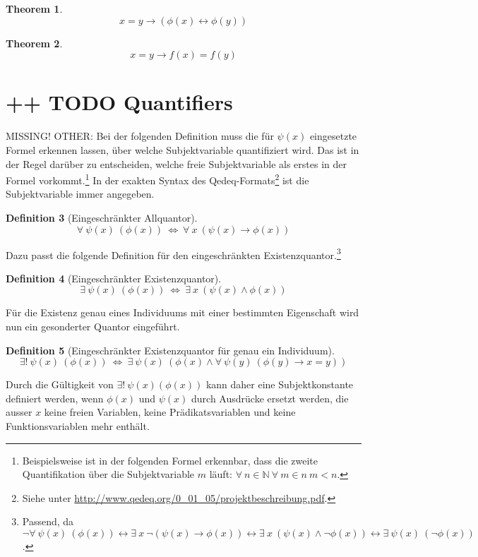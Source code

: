 \documentclass[a4paper,german,10pt,twoside]{book}
\newtheorem{thm}{Theorem}[chapter]
\theoremstyle{definition}
\newtheorem{defn}[thm]{Definition}
\theoremstyle{remark}
\begin{document}
\begin{thm}
\begin{equation}
x = y \rightarrow (\phi(x) \leftrightarrow \phi(y))
\end{equation}
\end{thm}

\begin{thm}
\begin{equation}
x = y \rightarrow f(x) = f(y)
\end{equation}
\end{thm}

\section{++ TODO Quantifiers} \label{chapter6_section1} \hypertarget{chapter6_section1}{}
MISSING! OTHER: Bei der folgenden Definition muss die f{\"u}r $\psi(x)$ eingesetzte Formel {\glqq erkennen
lassen\grqq}, {\"u}ber welche Subjektvariable quantifiziert wird. Das ist in der Regel dar{\"u}ber zu
entscheiden, welche freie Subjektvariable als erstes in der Formel
vorkommt.\footnote{Beispielsweise ist in der folgenden Formel erkennbar, dass die zweite
Quantifikation {\"u}ber die Subjektvariable $m$ l{\"a}uft: $\forall \ n \in \mathbb{N} \ \forall \ m \in n \ m < n
$.} In der exakten Syntax des Qedeq-Formats\footnote{Siehe unter
\url{http://www.qedeq.org/0_01_05/projektbeschreibung.pdf}.} ist die Subjektvariable immer
angegeben.
\begin{defn}[Eingeschr{\"a}nkter Allquantor]
$$ \forall \ \psi(x) \ (\phi(x)) \ \Leftrightarrow \ \forall \ x \ (\psi(x) \rightarrow \phi(x))$$
\end{defn}

Dazu passt die folgende Definition f{\"u}r den eingeschr{\"a}nkten Existenzquantor.\footnote{Passend, da
$\neg \forall \ \psi(x) \ (\phi(x)) \leftrightarrow \exists \ x \ \neg (\psi(x) \rightarrow \phi(x)) \leftrightarrow \exists
\ x \ (\psi(x) \land \neg\phi(x)) \leftrightarrow \exists \ \psi(x) \ (\neg\phi(x))$.}
\begin{defn}[Eingeschr{\"a}nkter Existenzquantor]
$$ \exists \ \psi(x) \ (\phi(x)) \ \Leftrightarrow \ \exists \ x \ (\psi(x) \land \phi(x))$$
\end{defn}

F{\"u}r die Existenz genau eines Individuums mit einer bestimmten Eigenschaft wird nun ein gesonderter
Quantor eingef{\"u}hrt.
\begin{defn}[Eingeschr{\"a}nkter Existenzquantor f{\"u}r genau ein Individuum]
$$ \exists! \ \psi(x) \ (\phi(x)) \ \Leftrightarrow \ \exists \ \psi(x) \ (\phi(x) \land \forall \ \psi(y) \ (\phi(y) \rightarrow x = y))$$
\end{defn}
Durch die G{\"u}ltigkeit von $\exists! \ \psi(x) (\phi(x))$ kann daher eine Subjektkonstante definiert
werden, wenn $\phi(x)$ und $\psi(x)$ durch Ausdr{\"u}cke ersetzt werden, die ausser $x$ keine freien
Variablen, keine Pr{\"a}dikatsvariablen und keine Funktionsvariablen mehr enth{\"a}lt.
\end{document}

